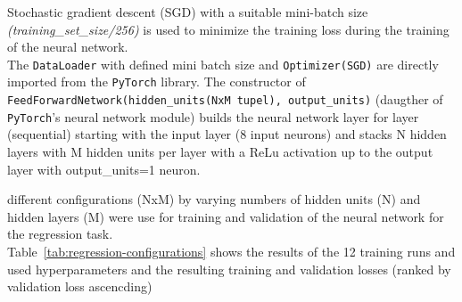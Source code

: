 \documentclass[11pt,a4paper]{article}
\begin{document}
\vspace{1em}
\noindent Stochastic gradient descent (SGD) with a suitable mini-batch size \textit{(training\_set\_size/256)} is used to minimize the training loss during the training of the neural network.
\\The \texttt{DataLoader} with defined mini batch size and \texttt{Optimizer(SGD)} are directly imported from the \texttt{PyTorch} library.
The constructor of \texttt{FeedForwardNetwork(hidden\_units(NxM tupel), output\_units)} (daugther of \texttt{PyTorch}'s neural network module) builds the neural network layer for layer (sequential)
starting with the input layer (8 input neurons) and stacks N hidden layers with M hidden units per layer with a ReLu activation up to the output layer with output\_units=1 neuron.

\vspace{1em}
 different configurations (NxM) by varying numbers of hidden units (N) and hidden layers (M) were use for training and validation of the neural network for the regression task.
\\Table~\ref{tab:regression-configurations} shows the results of the 12 training runs and used hyperparameters and the resulting training and validation losses (ranked by validation loss ascencding)

\begin{table}[htbp]
  \centering
  \caption{Regression configurations ranked by validation loss.}
  \label{tab:regression-configurations}
  \small
\end{table}
\end{document}
